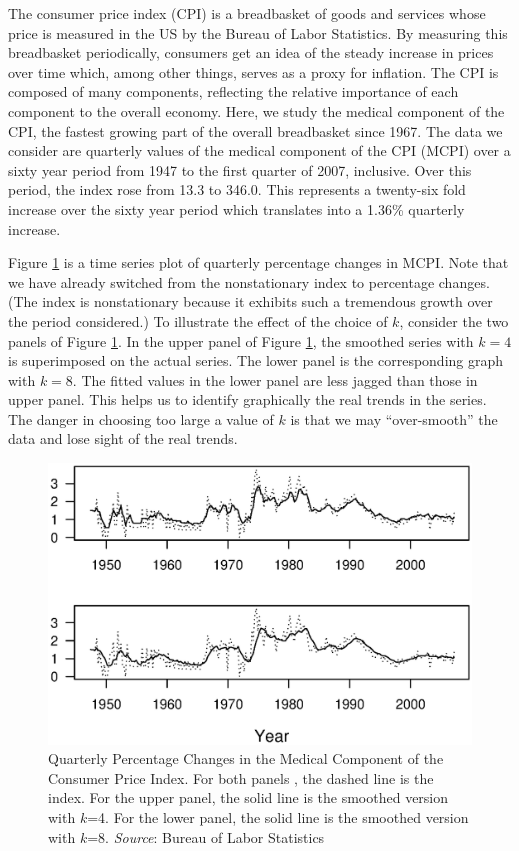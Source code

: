 The consumer price index (CPI) is a breadbasket of goods and
services whose price is measured in the US by the Bureau of Labor
Statistics. By measuring this breadbasket periodically, consumers
get an idea of the steady increase in prices over time which, among
other things, serves as a proxy for inflation. The CPI is composed
of many components, reflecting the relative importance of each
component to the overall economy. Here, we study the medical
component of the CPI, the fastest growing part of the overall
breadbasket since 1967. The data we consider are quarterly values of
the medical component of the CPI (MCPI) over a sixty year period
from 1947 to the first quarter of 2007, inclusive. Over this period,
the index rose from 13.3 to 346.0. This represents a twenty-six fold
increase over the sixty year period which translates into a 1.36\%
quarterly increase.

Figure \ref{F9:MCPISmooth} is a time series plot of quarterly
percentage changes in MCPI. Note that we have already switched from
the nonstationary index to percentage changes. (The index is
nonstationary because it exhibits such a tremendous growth over the
period considered.) To illustrate the effect of the choice of $k$,
consider the two panels of Figure \ref{F9:MCPISmooth}. In the upper
panel of Figure \ref{F9:MCPISmooth}, the smoothed series with $k=4$
is superimposed on the actual series. The lower panel is the
corresponding graph with $k=8$. The fitted values in the lower panel
are less jagged than those in upper panel. This helps us to identify
graphically the real trends in the series. The danger in choosing
too large a value of $k$ is that we may ``over-smooth'' the data and
lose sight of the real trends.


\begin{figure}[htp]
  \begin{center}
    \includegraphics[width=1\textwidth]
     {Chapter9Forecasting/MCPISmooth.eps}
    \caption{\label{F9:MCPISmooth} \small Quarterly
Percentage Changes in the Medical Component of the Consumer Price
Index. For both panels , the dashed line is the index. For the upper
panel, the solid line is the smoothed version with $k$=4. For the
lower panel, the solid line is the smoothed version with $k$=8.
\emph{Source}: Bureau of Labor Statistics}
  \end{center}
\end{figure}


